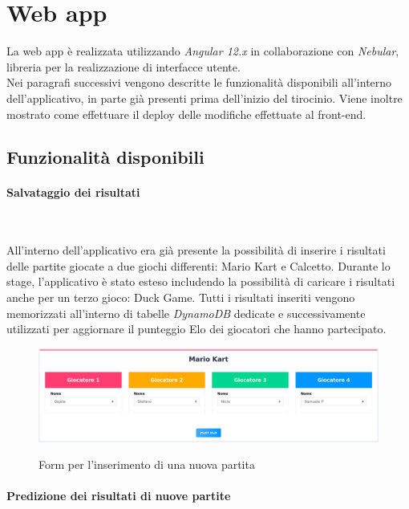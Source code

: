 \section{Web app}
La web app è realizzata utilizzando \emph{Angular 12.x} in collaborazione con \emph{Nebular}, libreria per la realizzazione di interfacce utente. \\
Nei paragrafi successivi vengono descritte le funzionalità disponibili all'interno dell'applicativo, in parte già presenti prima dell'inizio del tirocinio. Viene inoltre mostrato come effettuare il \gls{deploy} delle modifiche effettuate al front-end.
	\subsection{Funzionalità disponibili}
		\paragraph{Salvataggio dei risultati} ~\smallskip 
		
		\noindent All'interno dell'applicativo era già presente la possibilità di inserire i risultati delle partite giocate a due giochi differenti: Mario Kart e Calcetto. Durante lo stage, l'applicativo è stato esteso includendo la possibilità di caricare i risultati anche per un terzo gioco: Duck Game.
		Tutti i risultati inseriti vengono memorizzati all'interno di tabelle \emph{DynamoDB} dedicate e successivamente utilizzati per
		aggiornare il punteggio \gls{Elo} dei giocatori che hanno partecipato.
		
		\begin{figure}[H]
			\centering
			\includegraphics[width=\textwidth]{immagini/insPartita.png} \\
			\caption{\label{fig:inserimento} Form per l'inserimento di una nuova partita}
		\end{figure}
		
		\paragraph{Predizione dei risultati di nuove partite} ~\smallskip 
		
